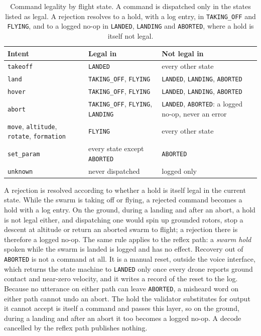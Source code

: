 \begin{table}[htbp]
\centering
\footnotesize
\caption[Command legality by flight state]{Command legality by flight state. A command is
dispatched only in the states listed as legal. A rejection resolves to a hold, with a log entry,
in \texttt{TAKING\_OFF} and \texttt{FLYING}, and to a logged no-op in \texttt{LANDED},
\texttt{LANDING} and \texttt{ABORTED}, where a hold is itself not legal.}
\label{tab:legality}
\begin{tabularx}{\textwidth}{@{}l X X@{}}
\toprule
Intent & Legal in & Not legal in \\
\midrule
\texttt{takeoff} & \texttt{LANDED} & every other state \\
\texttt{land} & \texttt{TAKING\_OFF}, \texttt{FLYING} & \texttt{LANDED}, \texttt{LANDING}, \texttt{ABORTED} \\
\texttt{hover} & \texttt{TAKING\_OFF}, \texttt{FLYING} & \texttt{LANDED}, \texttt{LANDING}, \texttt{ABORTED} \\
\texttt{abort} & \texttt{TAKING\_OFF}, \texttt{FLYING}, \texttt{LANDING} & \texttt{LANDED}, \texttt{ABORTED}: a logged no-op, never an error \\
\texttt{move}, \texttt{altitude}, \texttt{rotate}, \texttt{formation} & \texttt{FLYING} & every other state \\
\texttt{set\_param} & every state except \texttt{ABORTED} & \texttt{ABORTED} \\
\texttt{unknown} & never dispatched & logged only \\
\bottomrule
\end{tabularx}
\end{table}

A rejection is resolved according to whether a hold is itself legal in the current state. While
the swarm is taking off or flying, a rejected command becomes a hold with a log entry. On the
ground, during a landing and after an abort, a hold is not legal either, and dispatching one would
spin up grounded rotors, stop a descent at altitude or return an aborted swarm to flight; a
rejection there is therefore a logged no-op. The same rule applies to the reflex path: a
\emph{swarm hold} spoken while the swarm is landed is logged and has no effect. Recovery out of
\texttt{ABORTED} is not a command at all. It is a manual reset, outside the voice interface,
which returns the state machine to \texttt{LANDED} only once every drone reports ground contact
and near-zero velocity, and it writes a record of the reset to the log. Because no utterance on
either path can leave \texttt{ABORTED}, a misheard word on either path cannot undo an abort. The hold the validator substitutes for output
it cannot accept is itself a command and passes this layer, so on the ground, during a landing and
after an abort it too becomes a logged no-op. A decode cancelled by the reflex path publishes
nothing.

